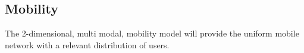 \subsection{Mobility}
The 2-dimensional, multi modal, mobility model \cite{bettstetter2001smooth} will provide the uniform mobile network with a relevant distribution of users.